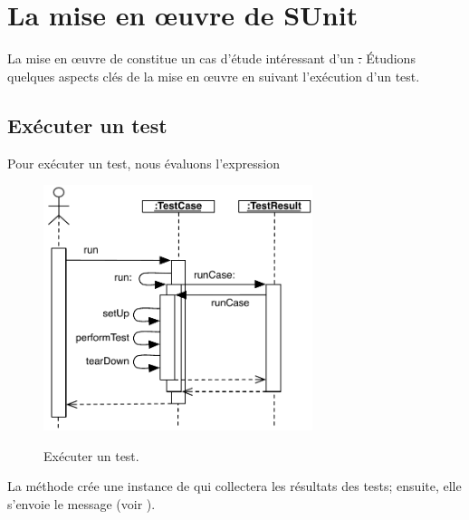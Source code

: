 \documentclass[a4paper,10pt,twoside]{book}
\begin{document}
\section{La mise en {\oe}uvre de SUnit}

La mise en {\oe}uvre de \sunit constitue un cas d'étude intéressant d'un \framework \st.
Étudions quelques aspects clés de la mise en {\oe}uvre en suivant l'exécution d'un test.
\subsection{Exécuter un test}

Pour exécuter un test, nous évaluons l'expression 

\begin{figure}[tbh]
  \begin{center} 
		{\includegraphics[width=0.7\textwidth]{sunit-scenario}}
	\caption{Exécuter un test.}
  \end{center}
\end{figure}

La méthode  crée une instance de  qui collectera les résultats des tests; ensuite, elle s'envoie le message 
(voir ).
\end{document}
